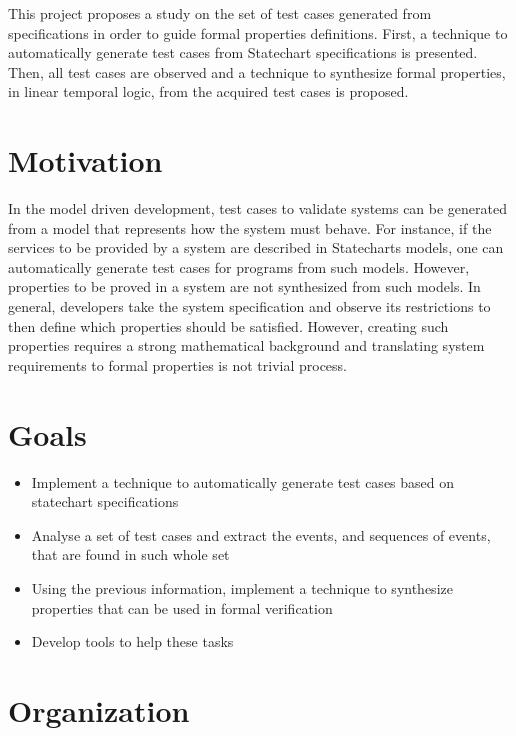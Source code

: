 This project proposes a study on the set of test cases generated from specifications in order to guide formal properties definitions. First, a technique to automatically generate test cases from Statechart specifications is presented. Then, all test cases are observed and a technique to synthesize formal properties, in linear temporal logic, from the acquired test cases is proposed. 

\section{Motivation}

In the model driven development, test cases to validate systems can be generated from a model that represents how the system must behave. For instance, if the services to be provided by a system are described in Statecharts models, one can  automatically generate test cases for programs from such models. However, properties to be proved in a system are not synthesized from such models. In general, developers take the system specification and observe its restrictions to then define which properties should be satisfied. However, creating such properties requires a strong mathematical background and translating system requirements to formal properties is not trivial process\cite{Prospec}.

\section{Goals}

\begin{itemize}

\item Implement a technique to automatically generate test cases based on statechart specifications

\item Analyse a set of test cases and extract the events, and sequences of events, that are found in such whole set

\item Using the previous information, implement a technique to synthesize properties that can be used in formal verification 

\item Develop tools to help these tasks

\end{itemize}

\section{Organization}

